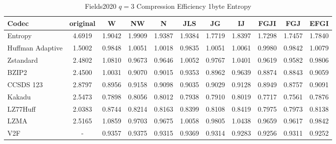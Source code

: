 \documentclass{article}
\begin{document}
\begin{table}[h!]
\centering
\caption{Fields2020 $q=3$ Compression Efficiency 1byte Entropy}
\begin{tabular}{|l|cccccccccc|}
\hline
Codec &  original &      W &     NW &      N &    JLS &     JG &     IJ &   FGJI &    FGJ &   EFGI \\
\hline
Entropy & 4.6919 & 1.9042 & 1.9909 & 1.9387 & 1.9384 & 1.7719 & 1.8397 & 1.7298 & 1.7457 & 1.7840 \\
\hline
Huffman Adaptive &    1.5002 & 0.9848 & 1.0051 & 1.0018 & 0.9835 & 1.0051 & 1.0061 & 0.9980 & 0.9842 & 1.0079 \\
Zstandard        &    2.4802 & 1.0810 & 0.9673 & 0.9646 & 1.0052 & 0.9767 & 1.0401 & 0.9619 & 0.9582 & 0.9806 \\
BZIP2            &    2.4500 & 1.0031 & 0.9070 & 0.9015 & 0.9353 & 0.8962 & 0.9639 & 0.8874 & 0.8843 & 0.9059 \\
CCSDS 123        &    2.8797 & 0.8956 & 0.9158 & 0.9098 & 0.9035 & 0.9029 & 0.9128 & 0.8949 & 0.8757 & 0.9091 \\
Kakadu           &    2.5473 & 0.7898 & 0.8056 & 0.8012 & 0.7938 & 0.7910 & 0.8019 & 0.7717 & 0.7561 & 0.7876 \\
LZ77Huff         &    2.0383 & 0.8744 & 0.8214 & 0.8163 & 0.8399 & 0.8108 & 0.8419 & 0.7975 & 0.7973 & 0.8138 \\
LZMA             &    2.5165 & 1.0859 & 0.9703 & 0.9675 & 1.0058 & 0.9805 & 1.0438 & 0.9659 & 0.9617 & 0.9842 \\
V2F              &    - & 0.9357 & 0.9375 & 0.9315 & 0.9369 & 0.9314 & 0.9283 & 0.9256 & 0.9311 & 0.9252 \\
\hline
\end{tabular}
\end{table}
\end{document}
